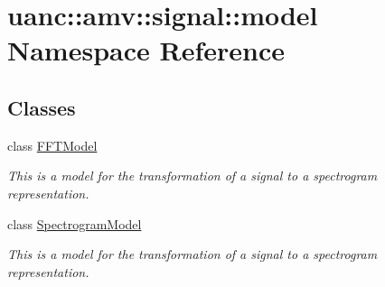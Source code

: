 \hypertarget{namespaceuanc_1_1amv_1_1signal_1_1model}{}\section{uanc\+:\+:amv\+:\+:signal\+:\+:model Namespace Reference}
\label{namespaceuanc_1_1amv_1_1signal_1_1model}
\subsection*{Classes}
\begin{DoxyCompactItemize}
\item 
class \hyperlink{classuanc_1_1amv_1_1signal_1_1model_1_1_f_f_t_model}{F\+F\+T\+Model}
\begin{DoxyCompactList}\small\item\em This is a model for the transformation of a signal to a spectrogram representation. \end{DoxyCompactList}\item 
class \hyperlink{classuanc_1_1amv_1_1signal_1_1model_1_1_spectrogram_model}{Spectrogram\+Model}
\begin{DoxyCompactList}\small\item\em This is a model for the transformation of a signal to a spectrogram representation. \end{DoxyCompactList}\end{DoxyCompactItemize}
